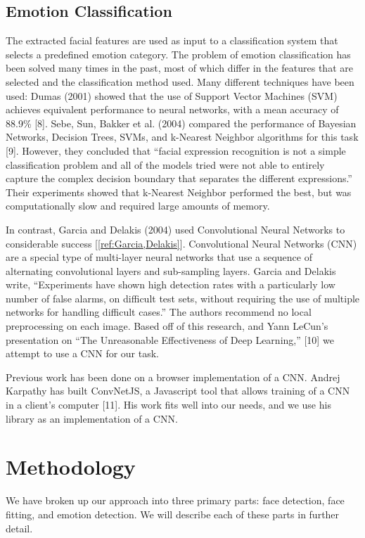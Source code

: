 \documentclass[10pt,twocolumn,letterpaper]{article}
\begin{document}
\subsection{Emotion Classification}

The extracted facial features are used as input to a classification system that selects a predefined emotion category. The problem of emotion classification has been solved many times in the past, most of which differ in the features that are selected and the classification method used. Many different techniques have been used: Dumas (2001) showed that the use of Support Vector Machines (SVM) achieves equivalent performance to neural networks, with a mean accuracy of 88.9\% [8]. Sebe, Sun, Bakker et al. (2004) compared the performance of Bayesian Networks, Decision Trees, SVMs, and k-Nearest Neighbor algorithms for this task [9]. However, they concluded that ``facial expression recognition is not a simple classification problem and all of the models tried were not able to entirely capture the complex decision boundary that separates the different expressions.'' Their experiments showed that k-Nearest Neighbor performed the best, but was computationally slow and required large amounts of memory. 

In contrast, Garcia and Delakis (2004) used Convolutional Neural Networks to considerable success [\ref{ref:Garcia,Delakis}]. Convolutional Neural Networks (CNN) are a special type of multi-layer neural networks that use a sequence of alternating convolutional layers and sub-sampling layers. Garcia and Delakis write, ``Experiments have shown high detection rates with a particularly low number of false alarms, on difficult test sets, without requiring the use of multiple networks for handling difficult cases.'' The authors recommend no local preprocessing on each image. Based off of this research, and Yann LeCun's presentation on ``The Unreasonable Effectiveness of Deep Learning,'' [10] we attempt to use a CNN for our task.  

Previous work has been done on a browser implementation of a CNN. Andrej Karpathy has built ConvNetJS, a Javascript tool that allows training of a CNN in a client's computer [11]. His work fits well into our needs, and we use his library as an implementation of a CNN.

\section{Methodology}

We have broken up our approach into three primary parts: face detection, face fitting, and emotion detection. We will describe each of these parts in further detail.
\end{document}
